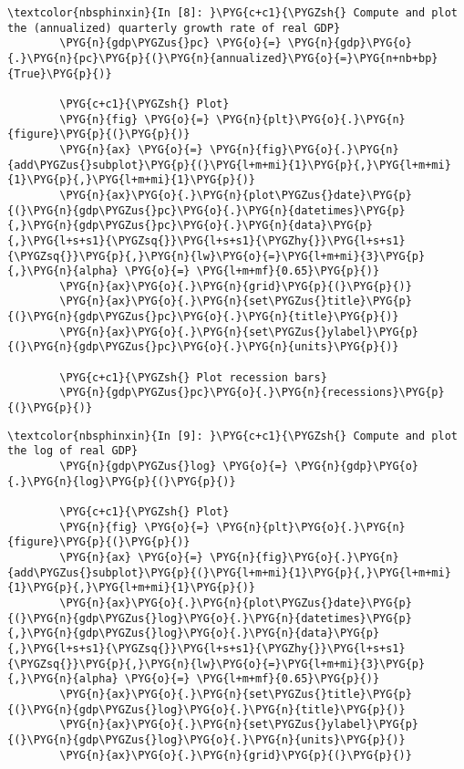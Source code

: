 \documentclass[letterpaper,10pt,openany,oneside,english]{sphinxmanual}
\begin{document}
\noindent{}

\begin{Verbatim}[commandchars=\\\{\}]
\textcolor{nbsphinxin}{In [8]: }\PYG{c+c1}{\PYGZsh{} Compute and plot the (annualized) quarterly growth rate of real GDP}
        \PYG{n}{gdp\PYGZus{}pc} \PYG{o}{=} \PYG{n}{gdp}\PYG{o}{.}\PYG{n}{pc}\PYG{p}{(}\PYG{n}{annualized}\PYG{o}{=}\PYG{n+nb+bp}{True}\PYG{p}{)}
        
        \PYG{c+c1}{\PYGZsh{} Plot}
        \PYG{n}{fig} \PYG{o}{=} \PYG{n}{plt}\PYG{o}{.}\PYG{n}{figure}\PYG{p}{(}\PYG{p}{)}
        \PYG{n}{ax} \PYG{o}{=} \PYG{n}{fig}\PYG{o}{.}\PYG{n}{add\PYGZus{}subplot}\PYG{p}{(}\PYG{l+m+mi}{1}\PYG{p}{,}\PYG{l+m+mi}{1}\PYG{p}{,}\PYG{l+m+mi}{1}\PYG{p}{)}
        \PYG{n}{ax}\PYG{o}{.}\PYG{n}{plot\PYGZus{}date}\PYG{p}{(}\PYG{n}{gdp\PYGZus{}pc}\PYG{o}{.}\PYG{n}{datetimes}\PYG{p}{,}\PYG{n}{gdp\PYGZus{}pc}\PYG{o}{.}\PYG{n}{data}\PYG{p}{,}\PYG{l+s+s1}{\PYGZsq{}}\PYG{l+s+s1}{\PYGZhy{}}\PYG{l+s+s1}{\PYGZsq{}}\PYG{p}{,}\PYG{n}{lw}\PYG{o}{=}\PYG{l+m+mi}{3}\PYG{p}{,}\PYG{n}{alpha} \PYG{o}{=} \PYG{l+m+mf}{0.65}\PYG{p}{)}
        \PYG{n}{ax}\PYG{o}{.}\PYG{n}{grid}\PYG{p}{(}\PYG{p}{)}
        \PYG{n}{ax}\PYG{o}{.}\PYG{n}{set\PYGZus{}title}\PYG{p}{(}\PYG{n}{gdp\PYGZus{}pc}\PYG{o}{.}\PYG{n}{title}\PYG{p}{)}
        \PYG{n}{ax}\PYG{o}{.}\PYG{n}{set\PYGZus{}ylabel}\PYG{p}{(}\PYG{n}{gdp\PYGZus{}pc}\PYG{o}{.}\PYG{n}{units}\PYG{p}{)}
        
        \PYG{c+c1}{\PYGZsh{} Plot recession bars}
        \PYG{n}{gdp\PYGZus{}pc}\PYG{o}{.}\PYG{n}{recessions}\PYG{p}{(}\PYG{p}{)}
\end{Verbatim}

\noindent{}

\begin{Verbatim}[commandchars=\\\{\}]
\textcolor{nbsphinxin}{In [9]: }\PYG{c+c1}{\PYGZsh{} Compute and plot the log of real GDP}
        \PYG{n}{gdp\PYGZus{}log} \PYG{o}{=} \PYG{n}{gdp}\PYG{o}{.}\PYG{n}{log}\PYG{p}{(}\PYG{p}{)}
        
        \PYG{c+c1}{\PYGZsh{} Plot}
        \PYG{n}{fig} \PYG{o}{=} \PYG{n}{plt}\PYG{o}{.}\PYG{n}{figure}\PYG{p}{(}\PYG{p}{)}
        \PYG{n}{ax} \PYG{o}{=} \PYG{n}{fig}\PYG{o}{.}\PYG{n}{add\PYGZus{}subplot}\PYG{p}{(}\PYG{l+m+mi}{1}\PYG{p}{,}\PYG{l+m+mi}{1}\PYG{p}{,}\PYG{l+m+mi}{1}\PYG{p}{)}
        \PYG{n}{ax}\PYG{o}{.}\PYG{n}{plot\PYGZus{}date}\PYG{p}{(}\PYG{n}{gdp\PYGZus{}log}\PYG{o}{.}\PYG{n}{datetimes}\PYG{p}{,}\PYG{n}{gdp\PYGZus{}log}\PYG{o}{.}\PYG{n}{data}\PYG{p}{,}\PYG{l+s+s1}{\PYGZsq{}}\PYG{l+s+s1}{\PYGZhy{}}\PYG{l+s+s1}{\PYGZsq{}}\PYG{p}{,}\PYG{n}{lw}\PYG{o}{=}\PYG{l+m+mi}{3}\PYG{p}{,}\PYG{n}{alpha} \PYG{o}{=} \PYG{l+m+mf}{0.65}\PYG{p}{)}
        \PYG{n}{ax}\PYG{o}{.}\PYG{n}{set\PYGZus{}title}\PYG{p}{(}\PYG{n}{gdp\PYGZus{}log}\PYG{o}{.}\PYG{n}{title}\PYG{p}{)}
        \PYG{n}{ax}\PYG{o}{.}\PYG{n}{set\PYGZus{}ylabel}\PYG{p}{(}\PYG{n}{gdp\PYGZus{}log}\PYG{o}{.}\PYG{n}{units}\PYG{p}{)}
        \PYG{n}{ax}\PYG{o}{.}\PYG{n}{grid}\PYG{p}{(}\PYG{p}{)}
\end{Verbatim}
\end{document}
